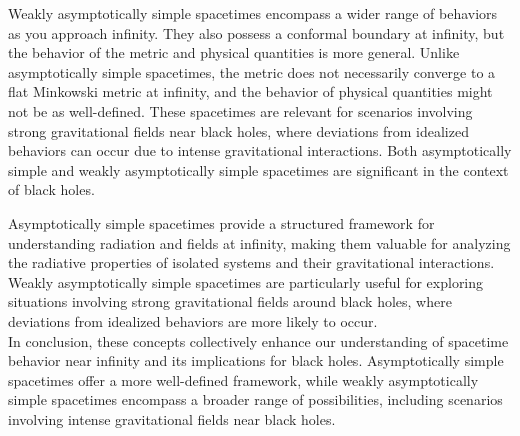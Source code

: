 Weakly asymptotically simple spacetimes encompass a wider range of behaviors as you approach infinity. They also possess a conformal boundary at infinity, but the behavior of the metric and physical quantities is more general. Unlike asymptotically simple spacetimes, the metric does not necessarily converge to a flat Minkowski metric at infinity, and the behavior of physical quantities might not be as well-defined. These spacetimes are relevant for scenarios involving strong gravitational fields near black holes, where deviations from idealized behaviors can occur due to intense gravitational interactions.
Both asymptotically simple and weakly asymptotically simple spacetimes are significant in the context of black holes.

Asymptotically simple spacetimes provide a structured framework for understanding radiation and fields at infinity, making them valuable for analyzing the radiative properties of isolated systems and their gravitational interactions.\\
Weakly asymptotically simple spacetimes are particularly useful for exploring situations involving strong gravitational fields around black holes, where deviations from idealized behaviors are more likely to occur.\\
In conclusion, these concepts collectively enhance our understanding of spacetime behavior near infinity and its implications for black holes. Asymptotically simple spacetimes offer a more well-defined framework, while weakly asymptotically simple spacetimes encompass a broader range of possibilities, including scenarios involving intense gravitational fields near black holes.

